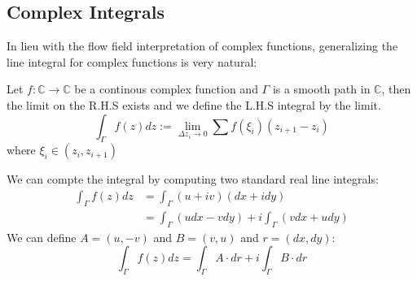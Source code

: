 \subsection{Complex Integrals}

In lieu with the flow field interpretation of complex functions, generalizing the line integral for complex functions is very natural:

\begin{definition}Let $f:\mathbb{C}\to \mathbb{C}$ be a continous complex function and $\Gamma$ is a smooth path in $\mathbb{C}$, then the limit on the R.H.S exists and we define the L.H.S
integral by the limit.
\begin{equation}
\int_{\Gamma} f(z)dz:=\lim_{\Delta z_i\to 0}\sum f(\xi_i)(z_{i+1}-z_i)
\end{equation}
where $\xi_i \in (z_i,z_{i+1})$

\end{definition}We can compte the integral by computing two standard real line integrals:
\begin{equation}
\begin{aligned}
\int_{\Gamma} f(z)dz &=\int_{\Gamma} (u+iv)(dx+idy) \\
&=\int_{\Gamma} (udx-vdy) + i\int_{\Gamma} (vdx+udy)
\end{aligned}
\end{equation}
We can define $A=(u, -v)$ and $B=(v,u)$ and $r=(dx,dy)$:
\begin{equation}
\int_{\Gamma} f(z)dz = \int_{\Gamma} A\cdot dr + i\int_{\Gamma}B\cdot dr
\end{equation}